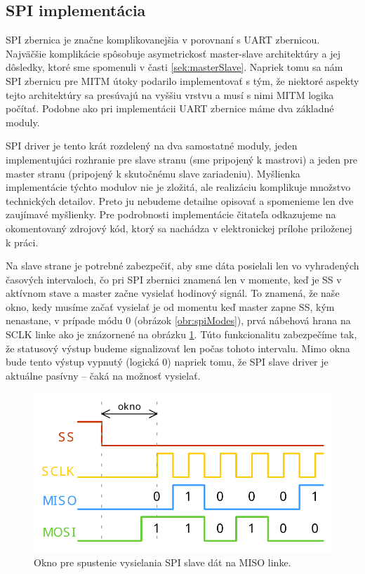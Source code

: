 \subsection{SPI implementácia} \label{sek:spiImplementation}
SPI zbernica je značne komplikovanejšia v porovnaní s UART zbernicou. Najväčšie komplikácie spôsobuje asymetrickosť master-slave architektúry a jej dôsledky, ktoré sme spomenuli v časti \ref{sek:masterSlave}. Napriek tomu sa nám SPI zbernicu pre MITM útoky podarilo implementovať s tým, že niektoré aspekty tejto architektúry sa presúvajú na vyššiu vrstvu a musí s nimi MITM logika počítať. Podobne ako pri implementácii UART zbernice máme dva základné moduly.

SPI driver je tento krát rozdelený na dva samostatné moduly, jeden implementujúci rozhranie pre slave stranu (sme pripojený k mastrovi) a jeden pre master stranu (pripojený k skutočnému slave zariadeniu). Myšlienka implementácie týchto modulov nie je zložitá, ale realizáciu komplikuje množstvo technických detailov. Preto ju nebudeme detailne opisovať a spomenieme len dve zaujímavé myšlienky. Pre podrobnosti implementácie čitateľa odkazujeme na okomentovaný zdrojový kód, ktorý sa nachádza v elektronickej prílohe priloženej k práci.

Na slave strane je potrebné zabezpečiť, aby sme dáta posielali len vo vyhradených časových intervaloch, čo pri SPI zbernici znamená len v momente, keď je SS v aktívnom stave a master začne vysielať hodinový signál. To znamená, že naše okno, kedy musíme začať vysielať je od momentu keď master zapne SS, kým nenastane, v prípade módu 0 (obrázok \ref{obr:spiModes}), prvá  nábehová hrana na SCLK linke ako je znázornené na obrázku \ref{obr:spiSlaveWindow}. Túto funkcionalitu zabezpečíme tak, že statusový výstup  budeme signalizovať len počas tohoto intervalu. Mimo okna bude tento výstup vypnutý (logická 0) napriek tomu, že SPI slave driver je aktuálne pasívny -- čaká na možnosť vysielať.

\begin{figure}
    \centerline{\includegraphics[width=1\textwidth]{images/signals/spiSlaveWindow.pdf}}
    \caption[Okno pre spustenie vysielania SPI slave dát]{Okno pre spustenie vysielania SPI slave dát na MISO linke.}
    \label{obr:spiSlaveWindow}
\end{figure}


